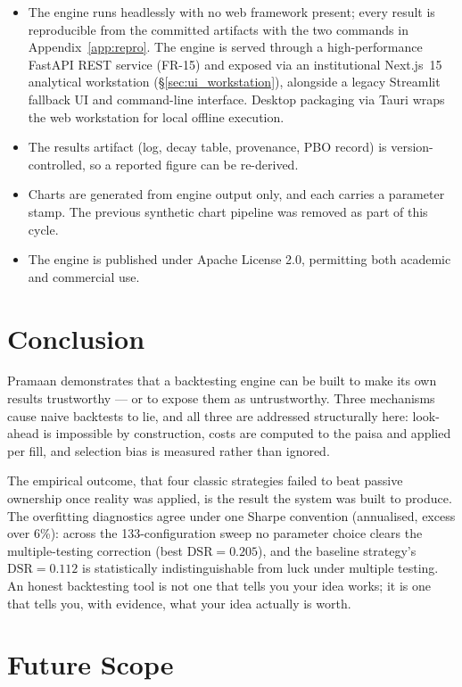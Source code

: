 \documentclass[12pt,a4paper,oneside]{report}
\begin{document}
\begin{itemize}[leftmargin=1.5cm]
    \item The engine runs headlessly with no web framework present; every result
    is reproducible from the committed artifacts with the two commands in
    Appendix~\ref{app:repro}. The engine is served through a high-performance
    FastAPI REST service (FR-15) and exposed via an institutional Next.js~15
    analytical workstation (\S\ref{sec:ui_workstation}), alongside a legacy
    Streamlit fallback UI and command-line interface. Desktop packaging via
    Tauri wraps the web workstation for local offline execution.
    \item The results artifact (log, decay table, provenance, PBO record) is
    version-controlled, so a reported figure can be re-derived.
    \item Charts are generated from engine output only, and each carries a
    parameter stamp. The previous synthetic chart pipeline was removed as part of
    this cycle.
    \item The engine is published under Apache License 2.0, permitting both
    academic and commercial use.
\end{itemize}

\section{Conclusion}

Pramaan demonstrates that a backtesting engine can be built to make its own
results trustworthy --- or to expose them as untrustworthy. Three mechanisms
cause naive backtests to lie, and all three are addressed structurally here:
look-ahead is impossible by construction, costs are computed to the paisa and
applied per fill, and selection bias is measured rather than ignored.

The empirical outcome, that four classic strategies failed to beat passive
ownership once reality was applied, is the result the system was built to
produce. The overfitting diagnostics agree under one Sharpe convention
(annualised, excess over 6\%): across the 133-configuration sweep no parameter
choice clears the multiple-testing correction (best $\text{DSR} = 0.205$), and
the baseline strategy's $\text{DSR} = 0.112$ is statistically indistinguishable
from luck under multiple testing. An honest backtesting tool is not one that
tells you your idea works; it is one that tells you, with evidence, what your
idea actually is worth.

\section{Future Scope}
\end{document}
